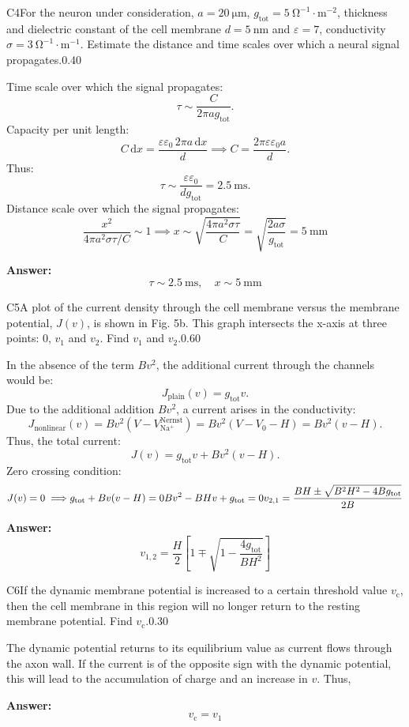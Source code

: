 \documentclass[11pt,a4paper]{article}
\begin{document}
\begin{solcard}{C4}{For the neuron under consideration, $a=20~\mathrm{\mu m}$, $g_\mathrm{tot}=5~\mathrm{\Omega}^{-1}\cdot \mathrm{m}^{-2}$, thickness and dielectric constant of the cell membrane $d=5~\mathrm{nm}$ and $\varepsilon=7$, conductivity $\sigma=3~\mathrm{\Omega}^{-1}\cdot \mathrm{m}^{-1}$. Estimate the distance and time scales over which a neural signal propagates.}{0.40}

Time scale over which the signal propagates:\[\tau\sim\dfrac{C}{2\pi ag_\mathrm{tot}}.\]Capacity per unit length:\[C\,\mathrm dx=\dfrac{\varepsilon\varepsilon_0 \,2\pi a\,\mathrm dx}{d}\implies C=\dfrac{2\pi\varepsilon\varepsilon_0a}{d}.\]Thus:\[\tau\sim\dfrac{\varepsilon\varepsilon_0}{dg_\mathrm{tot}}=2.5~\mathrm{ms}.\]Distance scale over which the signal propagates:\[\dfrac{x^2}{4\pi a^2\sigma \tau/C}\sim1\implies x\sim\sqrt{\dfrac{4\pi a^2\sigma\tau}{C}}=\sqrt{\dfrac{2a\sigma}{g_\mathrm{tot}}}=5~\mathrm{mm}\]

\par\smallskip\noindent\textbf{Answer:} \[\tau\sim 2.5 ~\mathrm{ms},\quad x\sim5~\mathrm{mm}\]
\end{solcard}

\begin{solcard}{C5}{A plot of the current density through the cell membrane versus the membrane potential, $J(v)$, is shown in Fig. 5b. This graph intersects the x-axis at three points: $0$, $v_1$ and $v_2$. Find $v_1$ and $v_2$.}{0.60}

In the absence of the term $Bv^2$, the additional current through the channels would be:\[J_\mathrm{plain}(v)=g_\mathrm{tot}v.\]Due to the additional addition $Bv^2$, a current arises in the conductivity:\[J_\mathrm{nonlinear}(v)=Bv^2\left(V-V_{\mathrm{Na^+}}^\mathrm{Nernst}\right)=Bv^2\left(V-V_0-H\right)=Bv^2(v-H).\]Thus, the total current:\[J(v)=g_\mathrm{tot}v+Bv^2(v-H).\]Zero crossing condition:\[J(v)=0\implies\\g_\mathrm{tot}+Bv(v-H)=0\\Bv^2-BHv+g_\mathrm{tot}=0\\v_{2,1}=\dfrac{BH\pm\sqrt{B^2H^2-4Bg_\mathrm{tot}}}{2B}\]

\par\smallskip\noindent\textbf{Answer:} \[v_{1,2}=\dfrac{H}{2}\left[1\mp\sqrt{1-\dfrac{4g_\mathrm{tot}}{BH^2}}\right]\]
\end{solcard}

\begin{solcard}{C6}{If the dynamic membrane potential is increased to a certain threshold value $v_\mathrm c$, then the cell membrane in this region will no longer return to the resting membrane potential. Find $v_\mathrm c$.}{0.30}

The dynamic potential returns to its equilibrium value as current flows through the axon wall. If the current is of the opposite sign with the dynamic potential, this will lead to the accumulation of charge and an increase in $v$. Thus,

\par\smallskip\noindent\textbf{Answer:} \[v_\mathrm c=v_1\]
\end{solcard}
\end{document}
